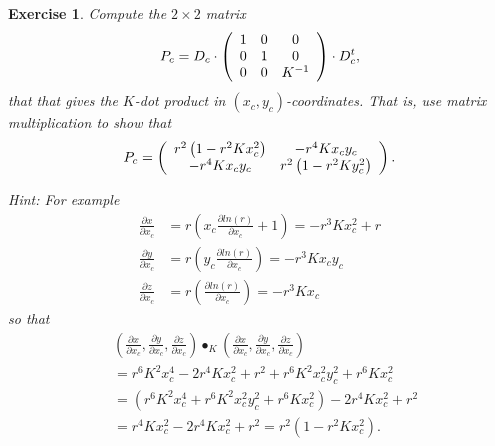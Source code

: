 \documentclass{article}%
\newtheorem{exercise}[theorem]{Exercise}
\begin{document}
\begin{exercise}
\label{32}Compute the $2\times2$ matrix%
\[
P_{c}=D_{c}\cdot\left(
\begin{array}
[c]{ccc}%
1 & 0 & 0\\
0 & 1 & 0\\
0 & 0 & K^{-1}%
\end{array}
\right)  \cdot D_{c}^{t},
\]
that that gives the $K$-dot product in $\left(  x_{c},y_{c}\right)
$-coordinates. That is, use matrix multiplication to show that%
\[
P_{c}=\left(
\begin{array}
[c]{cc}%
r^{2}\left(  1-r^{2}Kx_{c}^{2}\right)  & -r^{4}Kx_{c}y_{c}\\
-r^{4}Kx_{c}y_{c} & r^{2}\left(  1-r^{2}Ky_{c}^{2}\right)
\end{array}
\right)  .
\]


Hint: For example%
\begin{align*}
\frac{\partial x}{\partial x_{c}}  &  =r\left(  x_{c}\frac{\partial ln\left(
r\right)  }{\partial x_{c}}+1\right)  =-r^{3}Kx_{c}^{2}+r\\
\frac{\partial y}{\partial x_{c}}  &  =r\left(  y_{c}\frac{\partial ln\left(
r\right)  }{\partial x_{c}}\right)  =-r^{3}Kx_{c}y_{c}\\
\frac{\partial z}{\partial x_{c}}  &  =r\left(  \frac{\partial ln\left(
r\right)  }{\partial x_{c}}\right)  =-r^{3}Kx_{c}%
\end{align*}
so that%
\begin{align*}
&  \left(  \frac{\partial x}{\partial x_{c}},\frac{\partial y}{\partial x_{c}%
},\frac{\partial z}{\partial x_{c}}\right)  \bullet_{K}\left(  \frac{\partial
x}{\partial x_{c}},\frac{\partial y}{\partial x_{c}},\frac{\partial
z}{\partial x_{c}}\right) \\
&  =r^{6}K^{2}x_{c}^{4}-2r^{4}Kx_{c}^{2}+r^{2}+r^{6}K^{2}x_{c}^{2}y_{c}%
^{2}+r^{6}Kx_{c}^{2}\\
&  =\left(  r^{6}K^{2}x_{c}^{4}+r^{6}K^{2}x_{c}^{2}y_{c}^{2}+r^{6}Kx_{c}%
^{2}\right)  -2r^{4}Kx_{c}^{2}+r^{2}\\
&  =r^{4}Kx_{c}^{2}-2r^{4}Kx_{c}^{2}+r^{2}=r^{2}\left(  1-r^{2}Kx_{c}%
^{2}\right)  .
\end{align*}

\end{exercise}
\end{document}
